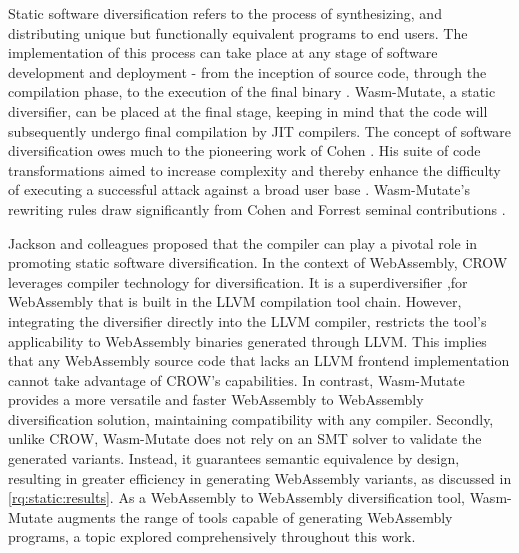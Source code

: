 \documentclass[a4paper,fleqn]{cas-dc}
\newcommand{\tool}{{\sc Wasm-Mutate}\xspace}
\newcommand{\Wasm}{WebAssembly\xspace}
\newcommand{\wasm}{\Wasm}
\begin{document}
Static software diversification refers to the process of  synthesizing, and distributing unique but functionally equivalent programs to end users. 
The implementation of this process can take place at any stage of software development and deployment - from the inception of source code, through the compilation phase, to the execution of the final binary \cite{jackson2011compiler, lundquist2016searching}.
\tool, a static diversifier, can be placed at the final stage, keeping in mind that the code will subsequently undergo final compilation by JIT compilers.
The concept of software diversification owes much to the pioneering work of Cohen \cite{cohen1993operating}. 
His suite of code transformations aimed to increase complexity and thereby enhance the difficulty of executing a successful attack against a broad user base \cite{cohen1993operating}. 
\tool's rewriting rules draw significantly from Cohen and Forrest seminal contributions \cite{cohen1993operating, 595185}.

Jackson and colleagues \cite{jackson2011compiler} proposed that the compiler can play a pivotal role in promoting static software diversification. 
In the context of \wasm, CROW leverages compiler technology for diversification.
It is a superdiversifier \cite{jacob2008superdiversifier},for \wasm that is built in the LLVM compilation tool chain. However, integrating the diversifier directly into the LLVM compiler, restricts the tool's applicability to \wasm binaries generated through LLVM. 
This implies that any \wasm source code that lacks an LLVM frontend implementation cannot take advantage of CROW's capabilities.
In contrast, \tool  provides a more versatile and faster \wasm to \wasm diversification solution, maintaining compatibility with any compiler. 
Secondly, unlike CROW, \tool does not rely on an SMT solver to validate the generated variants. 
Instead, it guarantees semantic equivalence by design, resulting in greater efficiency in generating \wasm variants, as discussed in \autoref{rq:static:results}.
As a \wasm to \wasm diversification tool, \tool augments the range of tools capable of generating \wasm programs, a topic explored comprehensively throughout this work.
\end{document}
